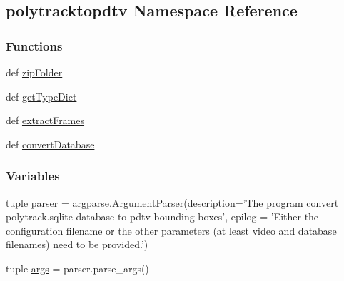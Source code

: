 \hypertarget{namespacepolytracktopdtv}{\subsection{polytracktopdtv Namespace Reference}
\label{namespacepolytracktopdtv}
}
\subsubsection*{Functions}
\begin{DoxyCompactItemize}
\item 
def \hyperlink{namespacepolytracktopdtv_ab71bb65e390ef819f51ccc03f0edc2cf}{zip\-Folder}
\item 
def \hyperlink{namespacepolytracktopdtv_a131b697625b20f6dc2a298a4af76cd37}{get\-Type\-Dict}
\item 
def \hyperlink{namespacepolytracktopdtv_a64b37205943eef6a4673ecda0bd8af54}{extract\-Frames}
\item 
def \hyperlink{namespacepolytracktopdtv_ae34a3ea5bfbe6d26096bc8a20f297216}{convert\-Database}
\end{DoxyCompactItemize}
\subsubsection*{Variables}
\begin{DoxyCompactItemize}
\item 
tuple \hyperlink{namespacepolytracktopdtv_ab8b5e788f5c71bf5c9e3fd8aa2d2b83a}{parser} = argparse.\-Argument\-Parser(description='The program convert polytrack.\-sqlite database to pdtv bounding boxes', epilog = 'Either the configuration filename or the other parameters (at least video and database filenames) need to be provided.')
\item 
tuple \hyperlink{namespacepolytracktopdtv_a923d4b320d9e6b80c0c5cc82628a2e23}{args} = parser.\-parse\-\_\-args()
\end{DoxyCompactItemize}



